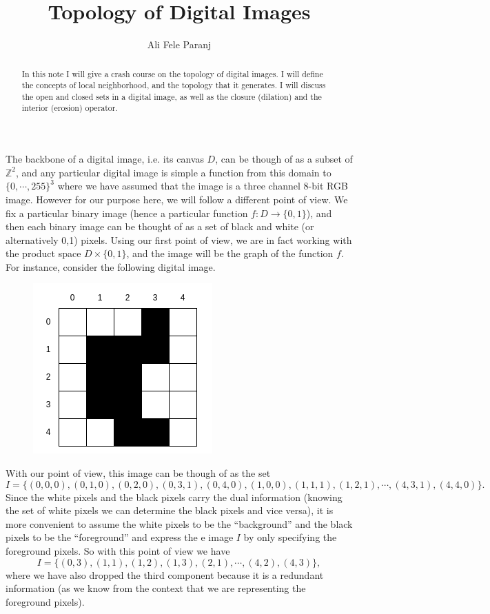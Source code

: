 \documentclass[11pt,a4paper]{article}
\title{Topology of Digital Images}
\author{Ali Fele Paranj}
\newcommand{\Z}{\mathbb{Z}}
\newcommand{\set}[1]{\{#1\}}
\theoremstyle{definition}
\theoremstyle{remark}
\begin{document}
	
	\maketitle
	\begin{abstract}
		In this note I will give a crash course on the topology of digital images. I will define the concepts of local neighborhood, and the topology that it generates. I will discuss the open and closed sets in a digital image, as well as the closure (dilation) and the interior (erosion) operator.
	\end{abstract}
	
	The backbone of a digital image, i.e. its canvas $ D $, can be though of as a subset of $ \Z^2 $, and any particular digital image is simple a function from this domain to $ \set{0,\cdots,255}^3 $ where we have assumed that the image is a three channel 8-bit RGB image. However for our purpose here, we will follow a different point of view. We fix a particular binary image (hence a particular function $ f: D\to \set{0,1} $), and then each binary image can be thought of as a set of black and white (or alternatively 0,1) pixels. Using our first point of view, we are in fact working with the product space $ D\times\set{0,1} $, and the image will be the graph of the function $ f $. For instance, consider the following digital image.
	\begin{figure}[h!]
		\centering
		\includegraphics[width=0.3\linewidth]{images/digitalImageExample}
		\label{fig:digitalimageexample}
	\end{figure}

	\FloatBarrier
	With our point of view, this image can be though of as the set
	\[ I = \set{(0,0,0),(0,1,0),(0,2,0),(0,3,1),(0,4,0),(1,0,0),(1,1,1),(1,2,1),\cdots,(4,3,1),(4,4,0)}. \]
	Since the white pixels and the black pixels carry the dual information (knowing the set of white pixels we can determine the black pixels and vice versa), it is more convenient to assume the white pixels to be the ``background'' and the black pixels to be the ``foreground'' and express the e image $ I $ by only specifying the foreground pixels. So with this point of view we have
	\[ I = \set{(0,3),(1,1),(1,2),(1,3),(2,1),\cdots,(4,2),(4,3)}, \]
	where we have also dropped the third component because it is a redundant information (as we know from the context that we are representing the foreground pixels). 
	
\end{document}
